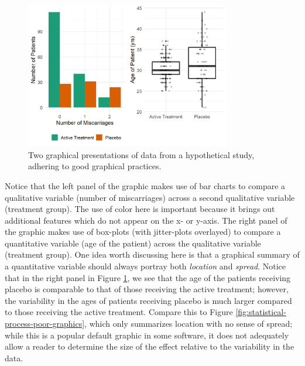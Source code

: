 \documentclass[
]{book}
\theoremstyle{plain}
\theoremstyle{mydefn}
\theoremstyle{myexmpl}
\theoremstyle{remark}
\begin{document}
\begin{figure}

{\centering \includegraphics[width=0.8\textwidth]{./Images/statistical-process-graphics-1} 

}

\caption{Two graphical presentations of data from a hypothetical study, adhering to good graphical practices.}\label{fig:statistical-process-graphics}
\end{figure}

Notice that the left panel of the graphic makes use of bar charts to compare a qualitative variable (number of miscarriages) across a second qualitative variable (treatment group). The use of color here is important because it brings out additional features which do not appear on the x- or y-axis. The right panel of the graphic makes use of box-plots (with jitter-plots overlayed) to compare a quantitative variable (age of the patient) across the qualitative variable (treatment group). One idea worth discussing here is that a graphical summary of a quantitative variable should always portray both \emph{location} and \emph{spread}. Notice that in the right panel in Figure \ref{fig:statistical-process-graphics}, we see that the age of the patients receiving placebo is comparable to that of those receiving the active treatment; however, the variability in the ages of patients receiving placebo is much larger compared to those receiving the active treatment. Compare this to Figure \ref{fig:statistical-process-poor-graphics}, which only summarizes location with no sense of spread; while this is a popular default graphic in some software, it does not adequately allow a reader to determine the size of the effect relative to the variability in the data.
\end{document}

